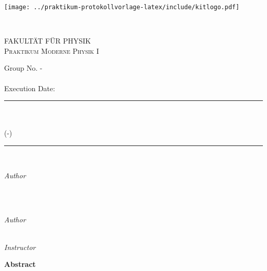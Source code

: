\begin{titlepage}

	\newcommand{\Hrule}{\rule{\linewidth}{0.5mm}}
	\begin{minipage}{0.5\textwidth}
		\begin{flushleft}
			\texttt{[image: ../praktikum-protokollvorlage-latex/include/kitlogo.pdf]}
		\end{flushleft}
	\end{minipage}
	~
	\begin{minipage}{0.5\textwidth}
		\begin{flushright}
			\textsc{FAKULTÄT FÜR PHYSIK\\Praktikum Moderne Physik I}
		\end{flushright}
	\end{minipage}\par

	\center
	{\LARGE Group No. \wochentag-\gruppennr}\\[1.5cm]
	{\Large \emailadressen}\\[0.5cm]
	{\large Execution Date: \durchgefuehrt}\\[0.5cm]

	\Hrule\\[0.4cm]
	{\huge\bfseries \versuch}\\[0.2cm]
	(\praktikum-\versuchsnr)\\[0.4cm]
	\Hrule\\[1.5cm]

	\begin{minipage}{0.4\textwidth}
		\begin{flushleft}
			\large
			\textit{Author}\\
			\vornamea\ \textsc{\nachnamea}
		\end{flushleft}
	\end{minipage}
	~
	\begin{minipage}{0.4\textwidth}
		\begin{flushright}
			\large
			\textit{Author}\\
			\vornameb\ \textsc{\nachnameb}
		\end{flushright}
	\end{minipage}\par
	\textit{Instructor}\\
	\betreuer

	\vfill\vfill
	{\LARGE \textbf{Abstract}}\\[0.4cm]

	\abstract

\end{titlepage}
